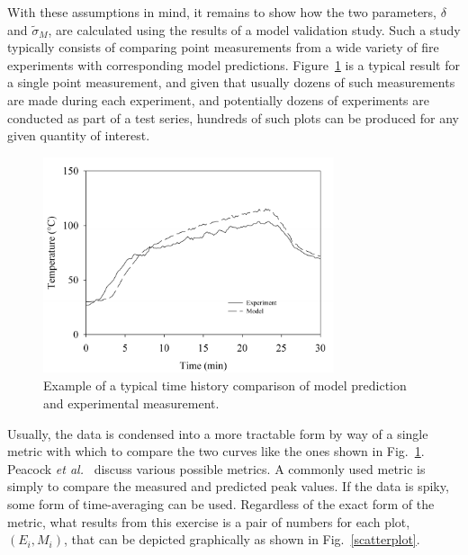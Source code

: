With these assumptions in mind, it remains to show how the two parameters, $\delta$ and $\widetilde{\sigma}_M$, are calculated using the
results of a model validation study.
Such a study typically consists of comparing point measurements from a wide variety of fire experiments
with corresponding model predictions.
Figure~\ref{temp_history} is a typical result for a single point measurement, and given that usually
dozens of such measurements are made during each experiment,
and potentially dozens of experiments are conducted as part of a test series, hundreds of such plots can be
produced for any given quantity of interest.
\begin{figure}[t]
\begin{center}
\includegraphics[height=2.5in]{FIGURES/sample_time_history}
\end{center}
\caption[Sample time history plots.]{Example of a typical time history comparison of model prediction and experimental measurement.}
\label{temp_history}
\end{figure}
Usually, the data is condensed into a more tractable form by way of a single metric with which to
compare the two curves like the ones shown in Fig.~\ref{temp_history}. Peacock {\em et al.}~\cite{Peacock:FSJ1999}
discuss various possible metrics. A commonly used metric is simply to compare the measured and predicted peak values.
If the data is spiky, some form of time-averaging can be used. Regardless of the exact form of the metric, what results from
this exercise is a pair of numbers for each plot, $(E_i,M_i)$, that can be depicted graphically as shown in Fig.~\ref{scatterplot}.

